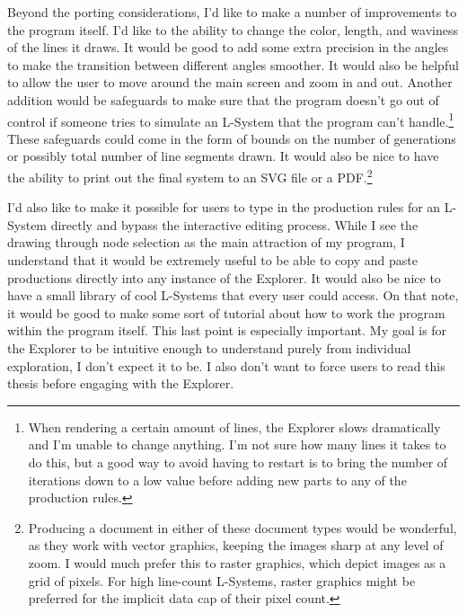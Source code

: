 \documentclass[12pt,twoside]{reedthesis}
\begin{document}
	Beyond the porting considerations, I'd like to make a number of improvements to the program itself. I'd like to the ability to change the color, length, and waviness of the lines it draws. It would be good to add some extra precision in the angles to make the transition between different angles smoother. It would also be helpful to allow the user to move around the main screen and zoom in and out. Another addition would be safeguards to make sure that the program doesn't go out of control if someone tries to simulate an L-System that the program can't handle.\footnote{When rendering a certain amount of lines, the Explorer slows dramatically and I'm unable to change anything. I'm not sure how many lines it takes to do this, but a good way to avoid having to restart is to bring the number of iterations down to a low value before adding new parts to any of the production rules.} These safeguards could come in the form of bounds on the number of generations or possibly total number of line segments drawn. It would also be nice to have the ability to print out the final system to an SVG file or a PDF.\footnote{Producing a document in either of these document types would be wonderful, as they work with vector graphics, keeping the images sharp at any level of zoom. I would much prefer this to raster graphics, which depict images as a grid of pixels. For high line-count L-Systems, raster graphics might be preferred for the implicit data cap of their pixel count.} 
	
	I'd also like to make it possible for users to type in the production rules for an L-System directly and bypass the interactive editing process. While I see the drawing through node selection as the main attraction of my program, I understand that it would be extremely useful to be able to copy and paste productions directly into any instance of the Explorer. It would also be nice to have a small library of cool L-Systems that every user could access. On that note, it would be good to make some sort of tutorial about how to work the program within the program itself. This last point is especially important. My goal is for the Explorer to be intuitive enough to understand purely from individual exploration, I don't expect it to be. I also don't want to force users to read this thesis before engaging with the Explorer.
	
\end{document}
